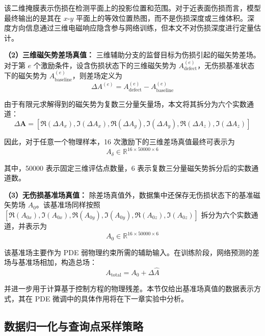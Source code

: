 该二维掩膜表示伤损在检测平面上的投影位置和范围。对于近表面伤损而言，模型最终输出的是其在 $x$-$y$ 平面上的等效位置热图，而不是伤损深度或三维体积。深度方向信息通过三维电磁响应隐含参与网络训练，但本文不对伤损深度进行定量估计。

\textbf{（2）三维磁矢势差场真值：}
三维辅助分支的监督目标为伤损引起的磁矢势差场。对于第 $e$ 个激励条件，设含伤损状态下的三维磁矢势为 $A_{\mathrm{defect}}^{(e)}$，无伤损基准状态下的磁矢势为 $A_{\mathrm{baseline}}^{(e)}$，则差场定义为
\begin{equation}
\label{eq:delta_A}
\Delta A^{(e)}
=
A_{\mathrm{defect}}^{(e)}
-
A_{\mathrm{baseline}}^{(e)}
\end{equation}

由于有限元求解得到的磁矢势为复数三分量矢量场，本文将其拆分为六个实数通道：
\begin{equation}
\label{eq:A_six_channels}
\Delta \mathbf A
=
[
\Re(\Delta A_x),
\Im(\Delta A_x),
\Re(\Delta A_y),
\Im(\Delta A_y),
\Re(\Delta A_z),
\Im(\Delta A_z)
]
\end{equation}

因此，对于任意一个物理样本，16 次激励下的三维差场真值最终可表示为
\begin{equation}
\label{eq:A_delta_shape}
A_{\delta}
\in
\mathbb{R}^{16\times50000\times6}
\end{equation}

其中，50000 表示固定三维评估点数量，6 表示复数三分量磁矢势拆分后的实数通道数。

\textbf{（3）无伤损基准场真值：}
除差场真值外，数据集中还保存无伤损状态下的基准磁矢势场 $A_0$。该基准场同样按照
$
[
\Re(A_{0x}),
\Im(A_{0x}),
\Re(A_{0y}),
\Im(A_{0y}),
\Re(A_{0z}),
\Im(A_{0z})
]
$
拆分为六个实数通道，并表示为
\begin{equation}
\label{eq:A0_shape}
A_{0}
\in
\mathbb{R}^{16\times50000\times6}
\end{equation}

该基准场主要作为 PDE 弱物理约束所需的辅助输入。在训练阶段，网络预测的差场与基准场相加，构造总场：
\begin{equation}
\label{eq:A_total}
A_{\mathrm{total}}
=
A_0+\Delta \hat A
\end{equation}

并进一步用于计算基于控制方程的物理残差。本节仅给出基准场真值的数据表示方式，其在 PDE 微调中的具体作用将在下一章实验中分析。

\subsection{数据归一化与查询点采样策略}
\label{subsec:normalization_sampling}

